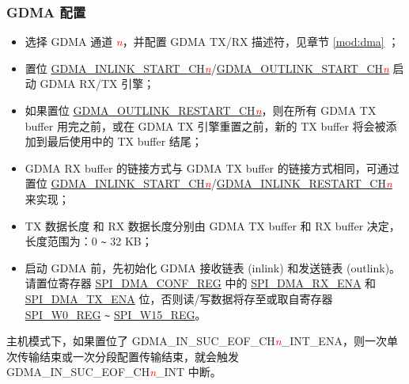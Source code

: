 \documentclass[main\_\_CN.tex]{subfiles}
\begin{document}
\subsubsection{GDMA 配置}\label{sec:DMA-conf}


\begin{itemize}
    \item 选择 GDMA 通道 \textcolor{red}{\it{n}}，并配置 GDMA TX/RX 描述符，见章节 \ref{mod:dma} \textit{}；

    \item 置位 \hyperref[fielddesc:GDMAINLINKSTARTCH0]{GDMA\_INLINK\_START\_CH\textcolor{red}{\it{n}}}/\hyperref[fielddesc:GDMAOUTLINKSTARTCH0]{GDMA\_OUTLINK\_START\_CH\textcolor{red}{\it{n}}}  启动 GDMA RX/TX 引擎；

    \item 如果置位 \hyperref[fielddesc:GDMAOUTLINKRESTARTCH0]{GDMA\_OUTLINK\_RESTART\_CH\textcolor{red}{\it{n}}}，则在所有 GDMA TX buffer 用完之前，或在 GDMA TX 引擎重置之前，新的 TX buffer 将会被添加到最后使用中的 TX buffer 结尾；

    \item GDMA RX buffer 的链接方式与 GDMA TX buffer 的链接方式相同，可通过置位 \hyperref[fielddesc:GDMAINLINKSTARTCH0]{GDMA\_INLINK\_START\_CH\textcolor{red}{\it{n}}}/\hyperref[fielddesc:GDMAINLINKRESTARTCH0]{GDMA\_INLINK\_RESTART\_CH\textcolor{red}{\it{n}}} 来实现；

    \item TX 数据长度 和 RX 数据长度分别由 GDMA TX buffer 和 RX buffer 决定，长度范围为：0 \verb+~+ 32 KB；

    \item 启动 GDMA 前，先初始化 GDMA 接收链表 (inlink) 和发送链表 (outlink)。请置位寄存器 \hyperref[regdesc:SPIDMACONFREG]{SPI\_DMA\_CONF\_REG} 中的 \hyperref[fielddesc:SPIDMARXENA]{SPI\_DMA\_RX\_ENA} 和 \hyperref[fielddesc:SPIDMATXENA]{SPI\_DMA\_TX\_ENA} 位，否则读/写数据将存至或取自寄存器 \hyperref[regdesc:SPIW0REG]{SPI\_W0\_REG} \verb+~+ \hyperref[regdesc:SPIW15REG]{SPI\_W15\_REG}。

\end{itemize}

主机模式下，如果置位了 GDMA\_IN\_SUC\_EOF\_CH\textcolor{red}{\it{n}}\_INT\_ENA，则一次单次传输结束或一次分段配置传输结束，就会触发 GDMA\_IN\_SUC\_EOF\_CH\textcolor{red}{\it{n}}\_INT  中断。
\end{document}
